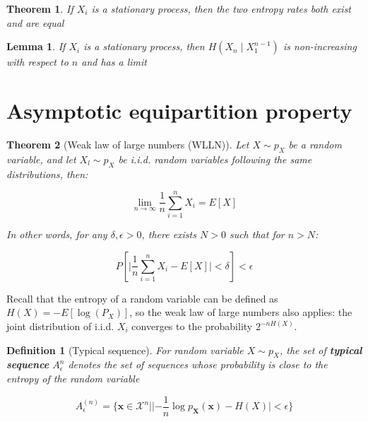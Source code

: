 \documentclass{article}
\newcommand{\norm}[1]{\vert {#1} \vert}
\newtheorem{definition}{Definition}[section]
\newtheorem{theorem}{Theorem}[section]
\newtheorem{lemma}{Lemma}[theorem]
\begin{document}
    \begin{theorem}
        If $X_i$ is a stationary process, then the two entropy rates both exist and are equal
    \end{theorem}
    \begin{lemma}
        If $X_i$ is a stationary process, then $H(X_n \mid X_1^{n-1})$ is non-increasing with respect to $n$ and has a limit
    \end{lemma}

\section{Asymptotic equipartition property}
    \begin{theorem}[Weak law of large numbers (WLLN)]
        Let $X \sim p_X$ be a random variable, and let $X_l \sim p_X$ be i.i.d. random variables following the same distributions, then:

        \begin{equation*}
            \lim_{n \rightarrow \infty}\frac{1}{n}\sum_{i=1}^n X_i = E[X]
        \end{equation*}

        In other words, for any $\delta, \epsilon > 0$, there exists $N > 0$ such that for $n > N$:

        \begin{equation*}
            P[\norm{\frac{1}{n}\sum_{i=1}^n X_i - E[X]} < \delta] < \epsilon
        \end{equation*}
    \end{theorem}

    Recall that the entropy of a random variable can be defined as $H(X) = -E[\log(P_X)]$, so the weak law of large numbers also applies: the joint distribution of i.i.d. $X_i$ converges to the probability $2^{-nH(X)}$.

    \begin{definition}[Typical sequence]
        For random variable $X \sim p_X$, the set of \textbf{typical sequence} $A_\epsilon^n$ denotes the set of sequences whose probability is close to the entropy of the random variable

        \begin{equation*}
            A_\epsilon^{(n)} = \{
                \mathbf{x} \in \mathcal{X}^n 
                \mid \norm{
                    -\frac{1}{n}\log p_{\mathbf{X}}(\mathbf{x})
                    - H(X)
                } < \epsilon
            \}
        \end{equation*}
    \end{definition}
\end{document}
